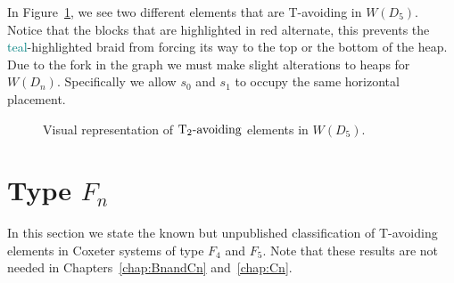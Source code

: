 In Figure~\ref{fig:Dtavoid}, we see two different elements that are T-avoiding in $W(D_5)$. Notice that the blocks that are highlighted in \textcolor{rred}{red} alternate, this prevents the \textcolor{teal}{teal}-highlighted braid from forcing its way to the top or the bottom of the heap. Due to the fork in the graph we must make slight alterations to heaps for $W(D_n)$. Specifically we allow $s_0$ and $s_1$ to occupy the same horizontal placement. 

\begin{figure}[h!]\centering

{}
\caption{Visual representation of $\operatorname{T_2-\mathrm{avoiding}}$ elements in $W(D_5)$.}\label{fig:Dtavoid}
\end{figure}


\section{Type $F_n$}

In this section we state the known but unpublished classification of T-avoiding elements in Coxeter systems of type $F_4$ and $F_5$. Note that these results are not needed in Chapters~\ref{chap:BnandCn} and~\ref{chap:Cn}. %

